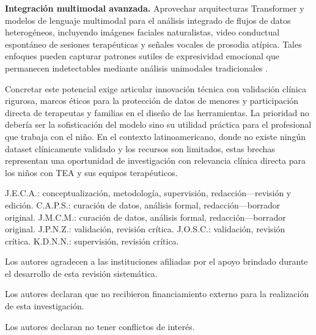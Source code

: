 \documentclass[ASNA,twocolumn]{USG}
\begin{document}
	\textbf{Integración multimodal avanzada.} Aprovechar arquitecturas Transformer y
	modelos de lenguaje multimodal para el análisis integrado de flujos de datos
	heterogéneos, incluyendo imágenes faciales naturalistas, video conductual espontáneo
	de sesiones terapéuticas y señales vocales de prosodia atípica. Tales enfoques
	pueden capturar patrones sutiles de expresividad emocional que permanecen
	indetectables mediante análisis unimodales tradicionales \cite{Washington2022}.
	
	Concretar este potencial exige articular innovación técnica con validación clínica
	rigurosa, marcos éticos para la protección de datos de menores y participación
	directa de terapeutas y familias en el diseño de las herramientas. La prioridad
	no debería ser la sofisticación del modelo sino su utilidad práctica para el
	profesional que trabaja con el niño. En el contexto latinoamericano, donde no
	existe ningún dataset clínicamente validado y los recursos son limitados, estas
	brechas representan una oportunidad de investigación con relevancia clínica
	directa para los niños con TEA y sus equipos terapéuticos.
	
	J.E.C.A.: conceptualización, metodología, supervisión, redacción---revisión y
	edición. C.A.P.S.: curación de datos, análisis formal, redacción---borrador
	original. J.M.C.M.: curación de datos, análisis formal, redacción---borrador
	original. J.P.N.Z.: validación, revisión crítica. J.O.S.C.: validación, revisión
	crítica. K.D.N.N.: supervisión, revisión crítica.
	
	Los autores agradecen a las instituciones afiliadas por el apoyo brindado durante
	el desarrollo de esta revisión sistemática.
	
	Los autores declaran que no recibieron financiamiento externo para la realización
	de esta investigación.
	
	Los autores declaran no tener conflictos de interés.
	
	
\end{document}

